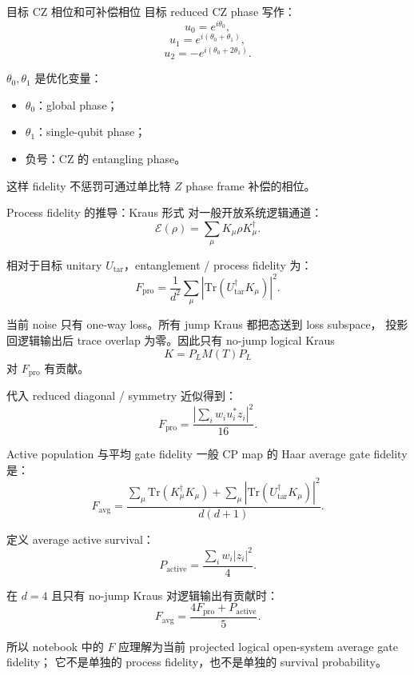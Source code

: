 \documentclass[aspectratio=169,11pt]{ctexbeamer}
\newcommand{\Fpro}{F_{\mathrm{pro}}}
\newcommand{\Pact}{P_{\mathrm{active}}}
\begin{document}
\begin{frame}{目标 CZ 相位和可补偿相位}
  目标 reduced CZ phase 写作：
  \[
  u_0=e^{i\theta_0},
  \]
  \[
  u_1=e^{i(\theta_0+\theta_1)},
  \]
  \[
  u_2=-e^{i(\theta_0+2\theta_1)}.
  \]

  \(\theta_0,\theta_1\) 是优化变量：
  \begin{itemize}
    \item \(\theta_0\)：global phase；
    \item \(\theta_1\)：single-qubit phase；
    \item 负号：CZ 的 entangling phase。
  \end{itemize}

  这样 fidelity 不惩罚可通过单比特 \(Z\) phase frame 补偿的相位。
\end{frame}

\begin{frame}{Process fidelity 的推导：Kraus 形式}
  对一般开放系统逻辑通道：
  \[
  \mathcal{E}(\rho)=\sum_\mu K_\mu\rho K_\mu^\dagger.
  \]

  相对于目标 unitary \(U_{\mathrm{tar}}\)，entanglement / process fidelity 为：
  \[
  \Fpro=
  \frac{1}{d^2}
  \sum_\mu
  \left|\mathrm{Tr}(U_{\mathrm{tar}}^\dagger K_\mu)\right|^2.
  \]

  当前 noise 只有 one-way loss。所有 jump Kraus 都把态送到 loss subspace，
  投影回逻辑输出后 trace overlap 为零。因此只有 no-jump logical Kraus
  \[
  K=P_LM(T)P_L
  \]
  对 \(\Fpro\) 有贡献。

  代入 reduced diagonal / symmetry 近似得到：
  \[
  \Fpro=
  \frac{\left|\sum_i w_i u_i^*z_i\right|^2}{16}.
  \]
\end{frame}

\begin{frame}{Active population 与平均 gate fidelity}
  一般 CP map 的 Haar average gate fidelity 是：
  \[
  F_{\mathrm{avg}}
  =
  \frac{
  \sum_\mu\mathrm{Tr}(K_\mu^\dagger K_\mu)
  +
  \sum_\mu|\mathrm{Tr}(U_{\mathrm{tar}}^\dagger K_\mu)|^2
  }{d(d+1)}.
  \]

  定义 average active survival：
  \[
  \Pact
  =
  \frac{\sum_i w_i |z_i|^2}{4}.
  \]

  在 \(d=4\) 且只有 no-jump Kraus 对逻辑输出有贡献时：
  \[
  F_{\mathrm{avg}}
  =
  \frac{4\Fpro+\Pact}{5}.
  \]

  所以 notebook 中的 \(F\) 应理解为当前 projected logical open-system average gate fidelity；
  它不是单独的 process fidelity，也不是单独的 survival probability。
\end{frame}
\end{document}
